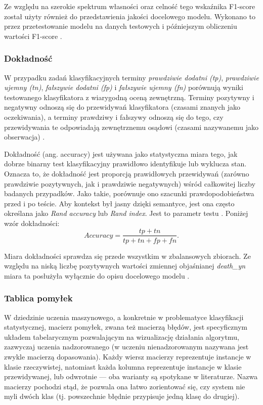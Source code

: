 \documentclass[polish, twoside, 12pt, a4paper]{article}
\theoremstyle{definition}
\theoremstyle{plain}
\theoremstyle{remark}
\begin{document}
Ze względu na szerokie spektrum własności oraz celność tego wskaźnika F1-score został użyty również do przedstawienia jakości docelowego modelu. Wykonano to przez przetestowanie modelu na danych testowych i późniejszym obliczeniu wartości F1-score \citep{powers2011}.

\subsubsection{Dokładność}

W przypadku zadań klasyfikacyjnych terminy \emph{prawdziwie dodatni (tp)}, \emph{prawdziwie ujemny (tn)}, \emph{fałszywie dodatni (fp)} i \emph{fałszywie ujemny (fn)} porównują wyniki testowanego klasyfikatora z wiarygodną oceną zewnętrzną. Terminy pozytywny i negatywny odnoszą się do przewidywań klasyfikatora (czasami znanych jako oczekiwania), a terminy prawdziwy i fałszywy odnoszą się do tego, czy przewidywania te odpowiadają zewnętrznemu osądowi (czasami nazywanemu jako obserwacja) \citep{fawcett2005}.

Dokładność (ang. accuracy) jest używana jako statystyczna miara tego, jak dobrze binarny test klasyfikacyjny prawidłowo identyfikuje lub wyklucza stan. Oznacza to, że dokładność jest proporcją prawidłowych przewidywań (zarówno prawdziwie pozytywnych, jak i prawdziwie negatywnych) wśród całkowitej liczby badanych przypadków. Jako takie, porównuje ono szacunki prawdopodobieństwa przed i po teście. Aby kontekst był jasny dzięki semantyce, jest ona często określana jako \emph{Rand accuracy} lub \emph{Rand index}. Jest to parametr testu \citep{powers2015}. Poniżej wzór dokładności:
\[ Accuracy = \frac{tp + tn}{tp + tn + fp + fn}. \]

Miara dokładności sprawdza się przede wszystkim w zbalansowych zbiorach. Ze względu na niską liczbę pozytywnych wartości zmiennej objaśnianej \emph{death\_yn} miara ta posłużyła wyłącznie do opisu docelowego modelu \cite{tharwat2018}.


\subsubsection{Tablica pomyłek}

W dziedzinie uczenia maszynowego, a konkretnie w problematyce klasyfikacji statystycznej, macierz pomyłek, zwana też macierzą błędów, jest specyficznym układem tabelarycznym pozwalającym na wizualizację działania algorytmu, zazwyczaj uczenia nadzorowanego (w uczeniu nienadzorowanym nazywana jest zwykle macierzą dopasowania). Każdy wiersz macierzy reprezentuje instancje w klasie rzeczywistej, natomiast każda kolumna reprezentuje instancje w klasie przewidywanej, lub odwrotnie --- oba warianty są spotykane w literaturze. Nazwa macierzy pochodzi stąd, że pozwala ona łatwo zorientować się, czy system nie myli dwóch klas (tj. powszechnie błędnie przypisuje jedną klasę do drugiej).
\end{document}
